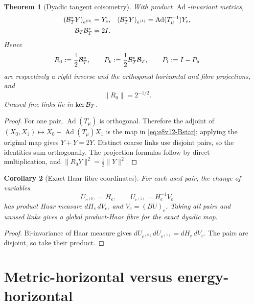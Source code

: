 \documentclass[11pt,oneside]{book}
\newtheorem{theorem}{Theorem}[chapter]
\newtheorem{corollary}[theorem]{Corollary}
\theoremstyle{definition}
\theoremstyle{remark}
\begin{document}
\begin{theorem}[Dyadic tangent coisometry]
\label{thm:e8v12-coisometry}
With product \(\operatorname{Ad}\)-invariant metrics,
\begin{align}
 ({\cal B}_T^*Y)_{e^{(0)}}&=Y_e,&
 ({\cal B}_T^*Y)_{e^{(1)}}&=\operatorname{Ad}(T_\mu^{-1})Y_e,
                                                               \label{eq:e8v12-Bstar}\\
 {\cal B}_T{\cal B}_T^*&=2I.                         \label{eq:e8v12-BBstar}
\end{align}
Hence
\[
 R_0:=\frac12{\cal B}_T^*,\qquad
 P_{\rm h}:=\frac12{\cal B}_T^*{\cal B}_T,\qquad
 P_{\rm f}:=I-P_{\rm h}                              \label{eq:e8v12-R0}
\]
are respectively a right inverse and the orthogonal horizontal and
fibre projections, and
\[
 \|R_0\|=2^{-1/2}.                                  \label{eq:e8v12-R0norm}
\]
Unused fine links lie in \(\ker{\cal B}_T\).
\end{theorem}

\begin{proof}
For one pair, \(\operatorname{Ad}(T_\mu)\) is orthogonal.  Therefore
the adjoint of
\((X_0,X_1)\mapsto X_0+\operatorname{Ad}(T_\mu)X_1\)
is the map in \eqref{eq:e8v12-Bstar}; applying the original map gives
\(Y+Y=2Y\).  Distinct coarse links use disjoint pairs, so the
identities sum orthogonally.  The projection formulas follow by
direct multiplication, and
\(\|R_0Y\|^2=\frac12\|Y\|^2\).
\end{proof}

\begin{corollary}[Exact Haar fibre coordinates]
\label{cor:e8v12-Haar}
For each used pair, the change of variables
\[
 U_{e^{(0)}}=H_e,\qquad
 U_{e^{(1)}}=H_e^{-1}V_e                            \label{eq:e8v12-Haar-coordinates}
\]
has product Haar measure \(dH_e\,dV_e\), and \(V_e=(BU)_e\).
Taking all pairs and unused links gives a global product-Haar fibre
for the exact dyadic map.
\end{corollary}

\begin{proof}
Bi-invariance of Haar measure gives
\(dU_{e^{(0)}}dU_{e^{(1)}}=dH_e\,dV_e\).  The pairs
are disjoint, so take their product.
\end{proof}

\section{Metric-horizontal versus energy-horizontal}
\label{sec:e8v12-energy}
\end{document}
